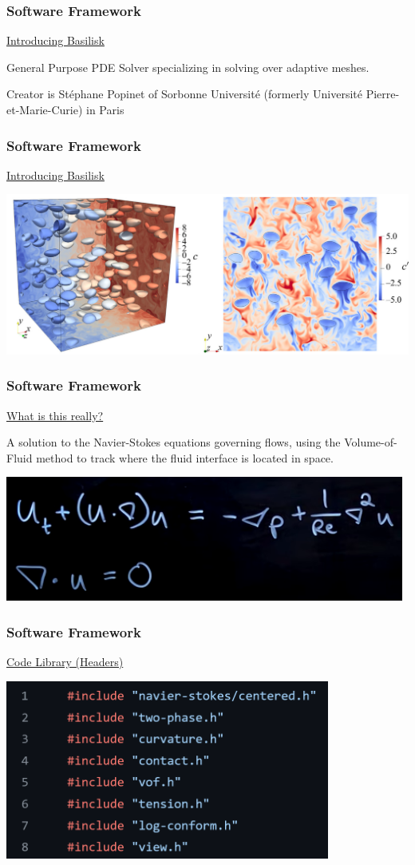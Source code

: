 \documentclass[12pt]{beamer}
\begin{document}
\begin{frame}
    \frametitle{Software Framework}
    \underline{Introducing Basilisk}

    General Purpose PDE Solver specializing in solving over adaptive meshes.

    Creator is Stéphane Popinet of Sorbonne Université (formerly Université Pierre-et-Marie-Curie) in Paris
\end{frame}
\begin{frame}
    \frametitle{Software Framework}
    \underline{Introducing Basilisk}

    \includegraphics[width=\textwidth]{img/3-hidman2023.jpg}
\end{frame}
\begin{frame}
    \frametitle{Software Framework}
    \underline{What is this really?}

    A solution to the Navier-Stokes equations governing flows,
    using the Volume-of-Fluid method to track where the fluid 
    interface is located in space.

    \includegraphics[width=\textwidth]{img/simplified-ns.png}
\end{frame}
\begin{frame}
    \frametitle{Software Framework}
    \underline{Code Library (Headers)}

    \includegraphics[width=0.8\textwidth]{img/5-headers.png}
\end{frame}
\end{document}
